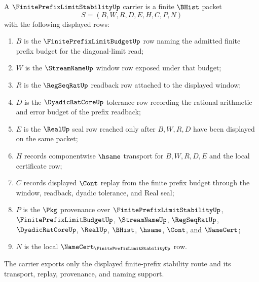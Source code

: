 \begin{definition}
\label{def:finite-prefix-limit-stability-carrier}
A $\FinitePrefixLimitStabilityUp$ carrier is a finite $\BHist$ packet
$$
S=(B,W,R,D,E,H,C,P,N)
$$
with the following displayed rows:
\begin{enumerate}
\item $B$ is the $\FinitePrefixLimitBudgetUp$ row naming the admitted finite prefix budget for the diagonal-limit read;
\item $W$ is the $\StreamNameUp$ window row exposed under that budget;
\item $R$ is the $\RegSeqRatUp$ readback row attached to the displayed window;
\item $D$ is the $\DyadicRatCoreUp$ tolerance row recording the rational arithmetic and error budget of the prefix readback;
\item $E$ is the $\RealUp$ seal row reached only after $B,W,R,D$ have been displayed on the same packet;
\item $H$ records componentwise $\hsame$ transport for $B,W,R,D,E$ and the local certificate row;
\item $C$ records displayed $\Cont$ replay from the finite prefix budget through the window, readback, dyadic tolerance, and Real seal;
\item $P$ is the $\Pkg$ provenance over $\FinitePrefixLimitStabilityUp$, $\FinitePrefixLimitBudgetUp$, $\StreamNameUp$, $\RegSeqRatUp$, $\DyadicRatCoreUp$, $\RealUp$, $\BHist$, $\hsame$, $\Cont$, and $\NameCert$;
\item $N$ is the local $\NameCert_{\FinitePrefixLimitStabilityUp}$ row.
\end{enumerate}
The carrier exports only the displayed finite-prefix stability route and its transport, replay, provenance, and naming support.
\end{definition}

